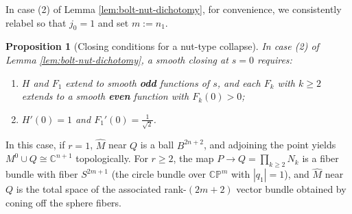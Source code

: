 \documentclass[11pt]{amsart}
\theoremstyle{plain}
\numberwithin{equation}{section}
\newtheorem{proposition}[theorem]{Proposition}
\theoremstyle{definition}
\theoremstyle{remark}
\begin{document}
In case (2) of Lemma \ref{lem:bolt-nut-dichotomy}, for convenience, we consistently relabel so that $j_0 = 1$ and set $m := n_1$.
\begin{proposition}[Closing conditions for a nut-type collapse]\label{prop:nut-closing}
	In case (2) of Lemma \ref{lem:bolt-nut-dichotomy}, a smooth closing at $s = 0$ requires:
	
	\begin{enumerate}
		\item $H$ and $F_1$ extend to smooth \textbf{odd} functions of $s$, and each $F_k$ with $k \geq 2$ extends to a smooth \textbf{even} function with $F_k(0) > 0$;
		\item $H'(0) = 1$ and $F_1'(0) = \tfrac{1}{\sqrt{2}}$.
	\end{enumerate}

	
	
	
	
	
	
\end{proposition}
In this case, if $r = 1$, $\widehat{M}$ near $Q$ is a ball $B^{2n+2}$, and adjoining the point yields $M^0 \cup Q \cong \mathbb{C}^{n+1}$ topologically. For $r \geq 2$, the map $P \to Q = \prod_{k \geq 2} N_k$ is a fiber bundle with fiber $S^{2m+1}$ (the circle bundle over $\mathbb{CP}^m$ with $|q_1| = 1$), and $\widehat{M}$ near $Q$ is the total space of the associated rank-$(2m+2)$ vector bundle obtained by coning off the sphere fibers.
\end{document}
